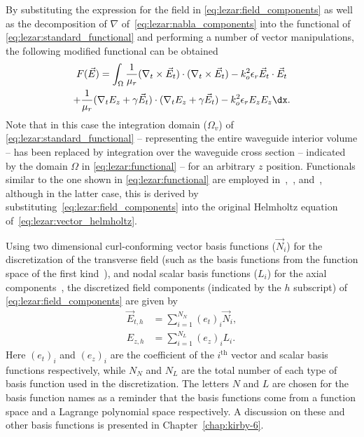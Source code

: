 By substituting the expression for the field in \eqref{eq:lezar:field_components} as well as the decomposition of $\nabla$ of~\eqref{eq:lezar:nabla_components} into the functional of \eqref{eq:lezar:standard_functional} and performing a number of vector manipulations, the following modified functional can be obtained
\begin{multline}
    \label{eq:lezar:functional}
    F(\vec{E}) = \int_{\Omega}\frac{1}{\mu_r}(\nabla_t\times{\vec{E}_t})\cdot(\nabla_t\times{\vec{E}_t}) -k_o^2\epsilon_r\vec{E}_t\cdot{\vec{E}_t}\\
    +\frac{1}{\mu_r}(\nabla_t{E_z} + \gamma\vec{E}_t)\cdot(\nabla_t{E_z} + \gamma\vec{E}_t)
    -k_o^2\epsilon_r E_z{E_z} \dx.
\end{multline}
Note that in this case the integration domain ($\Omega_v$) of \eqref{eq:lezar:standard_functional} -- representing the entire waveguide interior volume -- has been replaced by integration over the waveguide cross section -- indicated by the domain $\Omega$ in \eqref{eq:lezar:functional} -- for an arbitrary $z$ position. Functionals similar to the one shown in \eqref{eq:lezar:functional} are employed in~\citet{LeeSunCendes1991},~\citet{Jin2002}, and~\citet{PelosiCoccioliSelleri1998}, although in the latter case, this is derived by substituting~\eqref{eq:lezar:field_components} into the original Helmholtz equation of~\eqref{eq:lezar:vector_helmholtz}.

Using two dimensional curl-conforming vector basis functions ($\vec{N}_i$) for the discretization of the transverse field (such as the basis functions from the \nedelec{} function space of the first kind~\citep{Nedelec1980, Webb1993, Monk2003}), and nodal scalar basis functions ($L_i$) for the axial components~\citep{Jin2002, PelosiCoccioliSelleri1998}, the discretized field components (indicated by the $h$ subscript) of \eqref{eq:lezar:field_components} are given by~\citep{Jin2002, PelosiCoccioliSelleri1998}
\begin{align}
  \label{eq:lezar:E_t_discretized}
  \vec{E}_{t,h} &= \sum_{i=1}^{N_N} (e_t)_i \vec{N}_i,\\
  \label{eq:lezar:E_z_discretized}
  E_{z,h} &= \sum_{i=1}^{N_L} (e_z)_i L_i.
\end{align}
Here $(e_t)_i$ and $(e_z)_i$ are the coefficient of the $i^\text{th}$ vector and scalar basis functions respectively, while $N_N$ and $N_L$ are the total number of each type of basis function used in the discretization. The letters $N$ and $L$ are chosen for the basis function names as a reminder that the basis functions come from a \nedelec{} function space and a Lagrange polynomial space respectively. A discussion on these and other basis functions is presented in Chapter~\ref{chap:kirby-6}.

